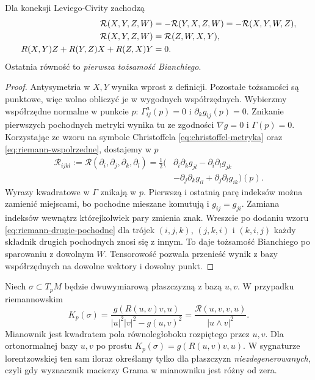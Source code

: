 \begin{twierdzenie}
\label{thm:symetrie-riemanna}
Dla koneksji Leviego-Civity zachodzą
\begin{align}\label{eq:symetrie-riemanna}
 \mathcal R(X,Y,Z,W)&=-\mathcal R(Y,X,Z,W)
                     =-\mathcal R(X,Y,W,Z),\\
 \mathcal R(X,Y,Z,W)&=\mathcal R(Z,W,X,Y),\notag\\
 R(X,Y)Z+R(Y,Z)X+R(Z,X)Y&=0.\notag
\end{align}
Ostatnia równość to \emph{pierwsza tożsamość Bianchiego}.
\end{twierdzenie}

\begin{proof}
Antysymetria w $X,Y$ wynika wprost z definicji.
Pozostałe tożsamości są punktowe, więc wolno obliczyć je
w wygodnych współrzędnych. Wybierzmy współrzędne normalne
w punkcie $p$: $\Gamma^a_{ij}(p)=0$ i
$\partial_k g_{ij}(p)=0$. Znikanie pierwszych pochodnych
metryki wynika tu ze zgodności $\nabla g=0$ i $\Gamma(p)=0$.
Korzystając ze wzoru na symbole Christoffela
\eqref{eq:christoffel-metryka} oraz
\eqref{eq:riemann-wspolrzedne}, dostajemy w $p$
\begin{equation}\label{eq:riemann-drugie-pochodne}
 \begin{split}
 \mathcal R_{ij k l}
 :=\mathcal R(\partial_i,\partial_j,\partial_k,\partial_l)
 =\frac12\bigl(&\partial_i\partial_k g_{jl}
      -\partial_i\partial_l g_{jk}\\
      &-\partial_j\partial_k g_{il}
      +\partial_j\partial_l g_{ik}\bigr)(p).
 \end{split}
\end{equation}
Wyrazy kwadratowe w $\Gamma$ znikają w $p$.
Pierwszą i ostatnią parę indeksów można zamienić
miejscami, bo pochodne mieszane komutują i $g_{ij}=g_{ji}$.
Zamiana indeksów wewnątrz którejkolwiek pary zmienia
znak. Wreszcie po dodaniu wzoru
\eqref{eq:riemann-drugie-pochodne} dla trójek
$(i,j,k)$, $(j,k,i)$ i $(k,i,j)$ każdy składnik
drugich pochodnych znosi się z innym. To daje tożsamość
Bianchiego po sparowaniu z dowolnym $W$.
Tensorowość pozwala przenieść wynik z bazy
współrzędnych na dowolne wektory i dowolny punkt.
\end{proof}

\begin{definicja}\label{def:krzywizna-sekcyjna}
Niech $\sigma\subset T_pM$ będzie dwuwymiarową
płaszczyzną z bazą $u,v$. W przypadku riemannowskim
\begin{equation}\label{eq:krzywizna-sekcyjna}
 K_p(\sigma)
 =\frac{g(R(u,v)v,u)}{|u|^2|v|^2-g(u,v)^2}
 =\frac{\mathcal R(u,v,v,u)}{|u\wedge v|^2}.
\end{equation}
Mianownik jest kwadratem pola równoległoboku
rozpiętego przez $u,v$. Dla ortonormalnej bazy
$u,v$ po prostu $K_p(\sigma)=g(R(u,v)v,u)$.
W sygnaturze lorentzowskiej ten sam iloraz określamy
tylko dla płaszczyzn \emph{niezdegenerowanych},
czyli gdy wyznacznik macierzy Grama w mianowniku
jest różny od zera.
\end{definicja}

